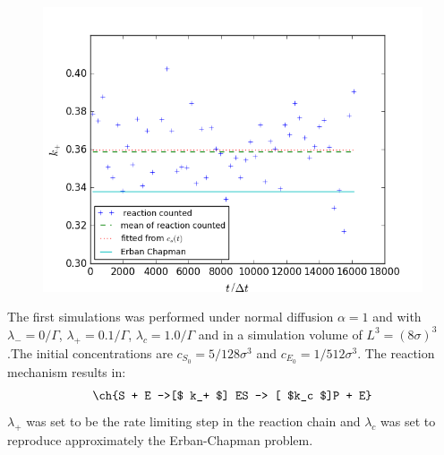 \documentclass[
  a4paper,BCOR10mm,oneside,
  headsepline,footsepline,%
  fleqn,openbib
]{scrbook}
\begin{document}
\begin{figure}
  \centering
  \includegraphics[width=\textwidth]{./data/chapman-limit-concentrations1_k1.png}
  \captionsetup{width=\linewidth}
  \label{fig:diffusion_limit-Erban-Chapmann_k1}
\end{figure}
The first simulations was performed under normal diffusion $\alpha=1$ and with $\lambda_-=0 /\Gamma$, $\lambda_+=0.1 /\Gamma$, $\lambda_c=1.0 /\Gamma$ and in a simulation volume of $L^3=(8 \sigma)^3$ .The initial concentrations are $c_{S_0}=5/128\sigma^3$ and $c_{E_0}=1/512 \sigma^3$. The reaction mechanism results in:
\begin{align} \label{eq:michaelismechanismneu}
\ch{S + E ->[$ k_+ $] ES -> [ $k_c $]P + E}
\end{align}
$\lambda_+$ was set to be the rate limiting step in the reaction chain and $\lambda_c$ was set to reproduce approximately the Erban-Chapman problem.
\end{document}
